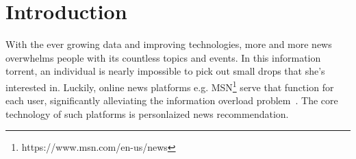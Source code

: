 \documentclass[sigconf,anonymous]{acmart}
\begin{document}


\keywords{}

\maketitle

\section{Introduction}
\label{section:introduction}
With the ever growing data and improving technologies, more and more news overwhelms people with its countless topics and events. In this information torrent, an individual is nearly impossible to pick out small drops that she's interested in. Luckily, online news platforms e.g. MSN\footnote{https://www.msn.com/en-us/news} serve that function for each user, significantly alleviating the information overload problem~\cite{personalized_news_recommendation}. The core technology of such platforms is personlaized news recommendation.
\end{document}
